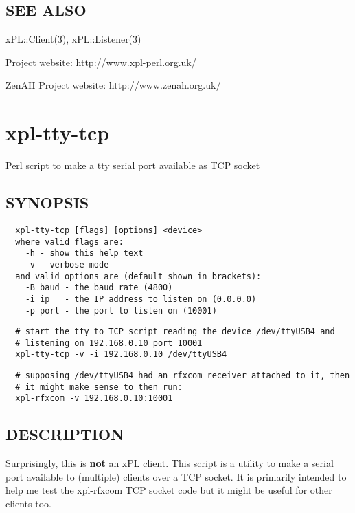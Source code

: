 \documentclass[12pt,a4paper]{article}
\begin{document}
\subsection*{SEE ALSO\label{xpl-sql-logger_SEE_ALSO}}


xPL::Client(3), xPL::Listener(3)



Project website: http://www.xpl-perl.org.uk/



ZenAH Project website: http://www.zenah.org.uk/

\newpage
\section{xpl-tty-tcp\label{xpl-tty-tcp}}


Perl script to make a tty serial port available as TCP socket

\subsection*{SYNOPSIS\label{xpl-tty-tcp_SYNOPSIS}}
\begin{verbatim}
  xpl-tty-tcp [flags] [options] <device>
  where valid flags are:
    -h - show this help text
    -v - verbose mode
  and valid options are (default shown in brackets):
    -B baud - the baud rate (4800)
    -i ip   - the IP address to listen on (0.0.0.0)
    -p port - the port to listen on (10001)
\end{verbatim}
\begin{verbatim}
  # start the tty to TCP script reading the device /dev/ttyUSB4 and
  # listening on 192.168.0.10 port 10001
  xpl-tty-tcp -v -i 192.168.0.10 /dev/ttyUSB4
\end{verbatim}
\begin{verbatim}
  # supposing /dev/ttyUSB4 had an rfxcom receiver attached to it, then
  # it might make sense to then run:
  xpl-rfxcom -v 192.168.0.10:10001
\end{verbatim}
\subsection*{DESCRIPTION\label{xpl-tty-tcp_DESCRIPTION}}


Surprisingly, this is \textbf{not} an xPL client.  This script is a utility
to make a serial port available to (multiple) clients over a TCP
socket.  It is primarily intended to help me test the xpl-rfxcom TCP
socket code but it might be useful for other clients too.
\end{document}
